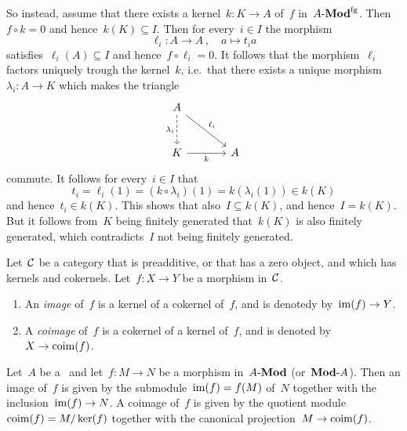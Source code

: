 \begin{example}
\begin{enumerate}
      So instead, assume that there exists a kernel~$k \colon K \to A$ of~$f$ in~$\text{$A$-$\mathbf{Mod}^{\mathrm{fg}}$}$.
      Then~$f \circ k = 0$ and hence~$k(K) \subseteq I$.
      Then for every~$i \in I$ the morphism
      \[
                \ell_i
        \colon  A
        \to     A \,,
        \quad   a
        \mapsto t_i a
      \]
      satisfies~$\ell_i(A) \subseteq I$ and hence~$f \circ \ell_i = 0$.
      It follows that the morphism~$\ell_i$ factors uniquely trough the kernel~$k$, i.e.\ that there exists a unique morphism~$\lambda_i \colon A \to K$ which makes the triangle
      \[
        \begin{tikzcd}[sep = large]
            A
            \arrow[dashed]{d}[left]{\lambda_i}
            \arrow{dr}[above right]{\ell_i}
          & {}
          \\
            K
            \arrow{r}[below]{k}
          & A
        \end{tikzcd}
      \]
      commute.
      It follows for every~$i \in I$ that
      \[
            t_i
        =   \ell_i(1)
        =   (k \circ \lambda_i)(1)
        =   k(\lambda_i(1))
        \in k(K)
      \]
      and hence~$t_i \in k(K)$.
      This shows that also~$I \subseteq k(K)$, and hence~$I = k(K)$.
      But it follows from~$K$ being finitely generated that~$k(K)$ is also finitely generated, which contradicts~$I$ not being finitely generated.
  \end{enumerate}
\end{example}




\begin{definition}
  Let~$\mathcal{C}$ be a category that is preadditive, or that has a zero object, and which has kernels and cokernels.
  Let~$f \colon X \to Y$ be a morphism in~$\mathcal{C}$.
  \begin{enumerate}
    \item
      An \emph{image} of~$f$ is a kernel of a cokernel of~$f$, and is denotedy by~$\operatorname{im}(f) \to Y$.
    \item
      A \emph{coimage} of~$f$ is a cokernel of a kernel of~$f$, and is denoted by~$X \to \operatorname{coim}(f)$.
  \end{enumerate}
\end{definition}


\begin{example*}
  Let~$A$ be a~{\kalg} and let~$f \colon M \to N$ be a morphism in~$\text{$A$-$\mathbf{Mod}$}$ (or~$\text{$\mathbf{Mod}$-$A$}$).
  Then an image of~$f$ is given by the submodule~$\operatorname{im}(f) = f(M)$ of~$N$ together with the inclusion~$\operatorname{im}(f) \to N$.
  A coimage of~$f$ is given by the quotient module~$\operatorname{coim}(f) = M/\ker(f)$ together with the canonical projection~$M \to \operatorname{coim}(f)$.
\end{example*}


